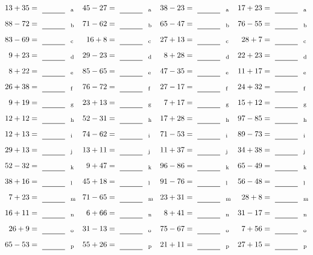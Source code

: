 \documentclass
[
  draft    = true,
  fontsize = 11pt,
  parskip  = half-
]
{scrartcl}
\begin{document}
\clearpage
\begin{align*}
    \pline{13+35}&=\rline{a}
  & \pline{45-27}&=\rline{a}
  & \pline{38-23}&=\rline{a}
  & \pline{17+23}&=\rline{a} \\[1ex]
    \pline{88-72}&=\rline{b}
  & \pline{71-62}&=\rline{b}
  & \pline{65-47}&=\rline{b}
  & \pline{76-55}&=\rline{b} \\[1ex]
    \pline{83-69}&=\rline{c}
  & \pline{16+8}&=\rline{c}
  & \pline{27+13}&=\rline{c}
  & \pline{28+7}&=\rline{c} \\[1ex]
    \pline{9+23}&=\rline{d}
  & \pline{29-23}&=\rline{d}
  & \pline{8+28}&=\rline{d}
  & \pline{22+23}&=\rline{d} \\[1ex]
    \pline{8+22}&=\rline{e}
  & \pline{85-65}&=\rline{e}
  & \pline{47-35}&=\rline{e}
  & \pline{11+17}&=\rline{e} \\[1ex]
    \pline{26+38}&=\rline{f}
  & \pline{76-72}&=\rline{f}
  & \pline{27-17}&=\rline{f}
  & \pline{24+32}&=\rline{f} \\[1ex]
    \pline{9+19}&=\rline{g}
  & \pline{23+13}&=\rline{g}
  & \pline{7+17}&=\rline{g}
  & \pline{15+12}&=\rline{g} \\[1ex]
    \pline{12+12}&=\rline{h}
  & \pline{52-31}&=\rline{h}
  & \pline{17+28}&=\rline{h}
  & \pline{97-85}&=\rline{h} \\[1ex]
    \pline{12+13}&=\rline{i}
  & \pline{74-62}&=\rline{i}
  & \pline{71-53}&=\rline{i}
  & \pline{89-73}&=\rline{i} \\[1ex]
    \pline{29+13}&=\rline{j}
  & \pline{13+11}&=\rline{j}
  & \pline{11+37}&=\rline{j}
  & \pline{34+38}&=\rline{j} \\[1ex]
    \pline{52-32}&=\rline{k}
  & \pline{9+47}&=\rline{k}
  & \pline{96-86}&=\rline{k}
  & \pline{65-49}&=\rline{k} \\[1ex]
    \pline{38+16}&=\rline{l}
  & \pline{45+18}&=\rline{l}
  & \pline{91-76}&=\rline{l}
  & \pline{56-48}&=\rline{l} \\[1ex]
    \pline{7+23}&=\rline{m}
  & \pline{71-65}&=\rline{m}
  & \pline{23+31}&=\rline{m}
  & \pline{28+8}&=\rline{m} \\[1ex]
    \pline{16+11}&=\rline{n}
  & \pline{6+66}&=\rline{n}
  & \pline{8+41}&=\rline{n}
  & \pline{31-17}&=\rline{n} \\[1ex]
    \pline{26+9}&=\rline{o}
  & \pline{31-13}&=\rline{o}
  & \pline{75-67}&=\rline{o}
  & \pline{7+56}&=\rline{o} \\[1ex]
    \pline{65-53}&=\rline{p}
  & \pline{55+26}&=\rline{p}
  & \pline{21+11}&=\rline{p}
  & \pline{27+15}&=\rline{p}
\end{align*}
\end{document}
